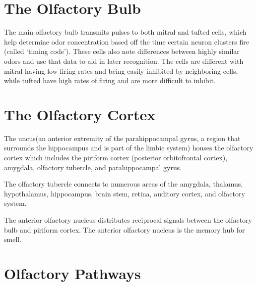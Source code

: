 \hypertarget{the-olfactory-bulb}{%
\section{The Olfactory Bulb}\label{the-olfactory-bulb}}

The main olfactory bulb transmits pulses to both mitral and tufted cells, which help determine odor concentration based off the time certain neuron clusters fire (called `timing code'). These cells also note differences between highly similar odors and use that data to aid in later recognition. The cells are different with mitral having low firing-rates and being easily inhibited by neighboring cells, while tufted have high rates of firing and are more difficult to inhibit.

\hypertarget{the-olfactory-cortex}{%
\section{The Olfactory Cortex}\label{the-olfactory-cortex}}

The uncus(an anterior extremity of the parahippocampal gyrus, a region that surrounds the hippocampus and is part of the limbic system) houses the olfactory cortex which includes the piriform cortex (posterior orbitofrontal cortex), amygdala, olfactory tubercle, and parahippocampal gyrus.

The olfactory tubercle connects to numerous areas of the amygdala, thalamus, hypothalamus, hippocampus, brain stem, retina, auditory cortex, and olfactory system.

The anterior olfactory nucleus distributes reciprocal signals between the olfactory bulb and piriform cortex. The anterior olfactory nucleus is the memory hub for smell.

\hypertarget{olfactory-pathways}{%
\section{Olfactory Pathways}\label{olfactory-pathways}}


